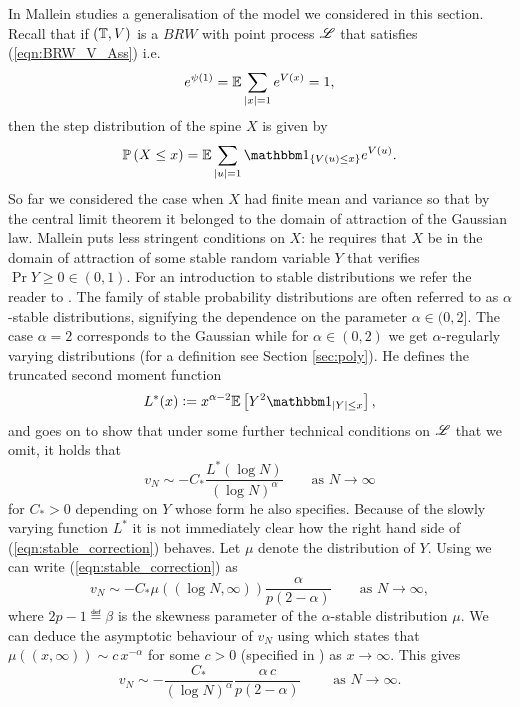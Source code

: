 In \cite[Lemma 4.2]{mallein2018n} Mallein studies a generalisation of the model we considered in this section. Recall that if $(\mathbb{T}, V)$ is a $BRW$ with point process $\mathscr{L}$ that satisfies (\ref{eqn:BRW_V_Ass}) i.e.
\begin{equation}\nonumber
e^{\psi(1)} = \mathbb{E} \sum\limits_{|x|=1} e^{V(x)} = 1, 
\end{equation}
then the step distribution of the spine $X$ is given by
\begin{equation}\nonumber
\Pr{X \leq x} = \E \sum\limits_{|u| = 1} \Ind_{\{V(u) \leq x\}} e^{V(u)}. 
\end{equation}
So far we considered the case when $X$ had finite mean and variance so that by the central limit theorem it belonged to the domain of attraction of the Gaussian law. Mallein puts less stringent conditions on $X$: he requires that $X$ be in the domain of attraction of some stable random variable $Y$ that verifies $\Pr{Y \geq 0} \in (0, 1)$. For an introduction to stable distributions we refer the reader to \cite[Section XVII]{feller1957introduction}. The family of stable probability distributions are often referred to as $\alpha$-stable distributions, signifying the dependence on the parameter $\alpha \in (0, 2]$. The case $\alpha = 2$ corresponds to the Gaussian while for $\alpha \in (0, 2)$ we get $\alpha$-regularly varying distributions (for a definition see Section \ref{sec:poly}). He defines the truncated second moment function
\begin{equation}\nonumber
L^*(x) \defeq x^{\alpha - 2} \Ex{Y^2 \Ind_{|Y| \leq x}}, 
\end{equation}
and goes on to show that under some further technical conditions on $\mathscr{L}$ that we omit, it holds that 
\begin{equation}\label{eqn:stable_correction}
v_N \sim - C_* \frac{L^*(\log N)}{(\log N)^\alpha} \qquad\text{as } N \to \infty
\end{equation}
for $C_* > 0$ depending on $Y$ whose form he also specifies. Because of the slowly varying function $L^*$ it is not immediately clear how the right hand side of (\ref{eqn:stable_correction}) behaves. Let $\mu$ denote the distribution of $Y$. Using \cite[Section XVII, (5.18) and (5.22)]{feller1957introduction} we can write (\ref{eqn:stable_correction}) as 
\begin{equation}\label{eqn:example_ppp2}
v_N \sim - C_* \mu((\log N, \infty)) \frac{\alpha}{p(2 - \alpha)} \qquad\text{as } N \to \infty, 
\end{equation}
where $2p - 1 \eqdef \beta$ is the skewness parameter of the $\alpha$-stable distribution $\mu$. We can deduce the asymptotic behaviour of $v_N$ using \cite[Theorem 1.12]{nolan2003stable} which states that $\mu((x, \infty)) \sim c\,x^{-\alpha}$ for some $c > 0$ (specified in \cite{nolan2003stable}) as $x \to \infty$. This gives 
\begin{equation}\nonumber
v_N \sim - \frac{C_*}{(\log N)^\alpha} \frac{\alpha\,c}{p(2 - \alpha)} \qquad\text{ as }N \to \infty. 
\end{equation}






\newpage